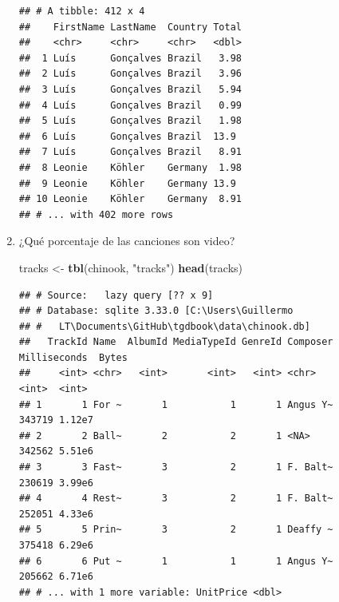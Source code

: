 \documentclass[
]{book}
\newenvironment{Shaded}{\begin{snugshade}}{\end{snugshade}}
\newcommand{\DataTypeTok}[1]{\textcolor[rgb]{0.13,0.29,0.53}{#1}}
\newcommand{\KeywordTok}[1]{\textcolor[rgb]{0.13,0.29,0.53}{\textbf{#1}}}
\newcommand{\NormalTok}[1]{#1}
\newcommand{\OperatorTok}[1]{\textcolor[rgb]{0.81,0.36,0.00}{\textbf{#1}}}
\newcommand{\StringTok}[1]{\textcolor[rgb]{0.31,0.60,0.02}{#1}}
\begin{document}
\begin{enumerate}
\begin{verbatim}
## # A tibble: 412 x 4
##    FirstName LastName  Country Total
##    <chr>     <chr>     <chr>   <dbl>
##  1 Luís      Gonçalves Brazil   3.98
##  2 Luís      Gonçalves Brazil   3.96
##  3 Luís      Gonçalves Brazil   5.94
##  4 Luís      Gonçalves Brazil   0.99
##  5 Luís      Gonçalves Brazil   1.98
##  6 Luís      Gonçalves Brazil  13.9 
##  7 Luís      Gonçalves Brazil   8.91
##  8 Leonie    Köhler    Germany  1.98
##  9 Leonie    Köhler    Germany 13.9 
## 10 Leonie    Köhler    Germany  8.91
## # ... with 402 more rows
\end{verbatim}
\item
  ¿Qué porcentaje de las canciones son video?

\begin{Shaded}
\begin{Highlighting}[]
\NormalTok{tracks <-}\StringTok{ }\KeywordTok{tbl}\NormalTok{(chinook, }\StringTok{"tracks"}\NormalTok{)}
\KeywordTok{head}\NormalTok{(tracks) }
\end{Highlighting}
\end{Shaded}

\begin{verbatim}
## # Source:   lazy query [?? x 9]
## # Database: sqlite 3.33.0 [C:\Users\Guillermo
## #   LT\Documents\GitHub\tgdbook\data\chinook.db]
##   TrackId Name  AlbumId MediaTypeId GenreId Composer Milliseconds  Bytes
##     <int> <chr>   <int>       <int>   <int> <chr>           <int>  <int>
## 1       1 For ~       1           1       1 Angus Y~       343719 1.12e7
## 2       2 Ball~       2           2       1 <NA>           342562 5.51e6
## 3       3 Fast~       3           2       1 F. Balt~       230619 3.99e6
## 4       4 Rest~       3           2       1 F. Balt~       252051 4.33e6
## 5       5 Prin~       3           2       1 Deaffy ~       375418 6.29e6
## 6       6 Put ~       1           1       1 Angus Y~       205662 6.71e6
## # ... with 1 more variable: UnitPrice <dbl>
\end{verbatim}

\begin{Shaded}
\end{Shaded}


\end{enumerate}
\end{document}
